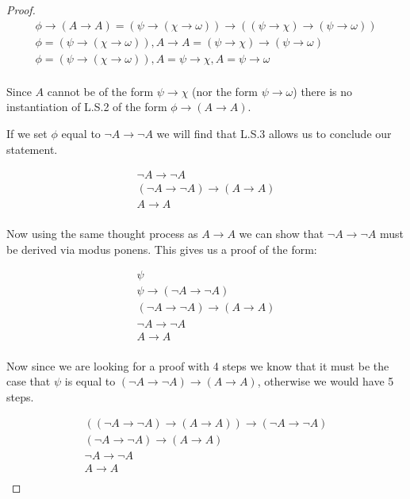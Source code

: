 \documentclass{article}
\begin{document}
\begin{proof}
\begin{gather*}
\phi \rightarrow (A \rightarrow A) = (\psi \rightarrow (\chi \rightarrow \omega)) \rightarrow ((\psi \rightarrow \chi) \rightarrow (\psi \rightarrow \omega)) \\
\phi = (\psi \rightarrow (\chi \rightarrow \omega)), A \rightarrow A = (\psi \rightarrow \chi) \rightarrow (\psi \rightarrow \omega) \\
\phi = (\psi \rightarrow (\chi \rightarrow \omega)), A = \psi \rightarrow \chi, A = \psi \rightarrow \omega \\
\end{gather*}

Since $A$ cannot be of the form $\psi \rightarrow \chi$ (nor the form $\psi \rightarrow \omega$) there is no instantiation of L.S.2 of the form $\phi \rightarrow (A \rightarrow A)$.

If we set $\phi$ equal to $\neg A \rightarrow \neg A$ we will find that L.S.3 allows us to conclude our statement.

\begin{gather*}
\neg A \rightarrow \neg A \\
(\neg A \rightarrow \neg A) \rightarrow (A \rightarrow A) \tag*{L.S.3} \\
A \rightarrow A \tag*{Modus Ponens}\\
\end{gather*}

Now using the same thought process as $A \rightarrow A$ we can show that $\neg A \rightarrow \neg A$ must be derived via modus ponens.
This gives us a proof of the form:

\begin{gather*}
\psi \\
\psi \rightarrow (\neg A \rightarrow \neg A) \\
(\neg A \rightarrow \neg A) \rightarrow (A \rightarrow A) \tag*{L.S.3} \\
\neg A \rightarrow \neg A \tag*{Modus Ponens}\\
A \rightarrow A \tag*{Modus Ponens}\\
\end{gather*}

Now since we are looking for a proof with 4 steps we know that it must be the case that $\psi$ is equal to $(\neg A \rightarrow \neg A) \rightarrow (A \rightarrow A)$, otherwise we would have 5 steps.

\begin{gather*}
((\neg A \rightarrow \neg A) \rightarrow (A \rightarrow A)) \rightarrow (\neg A \rightarrow \neg A) \\
(\neg A \rightarrow \neg A) \rightarrow (A \rightarrow A) \tag*{L.S.3} \\
\neg A \rightarrow \neg A \tag*{Modus Ponens}\\
A \rightarrow A \tag*{Modus Ponens}\\
\end{gather*}


\end{proof}
\end{document}
